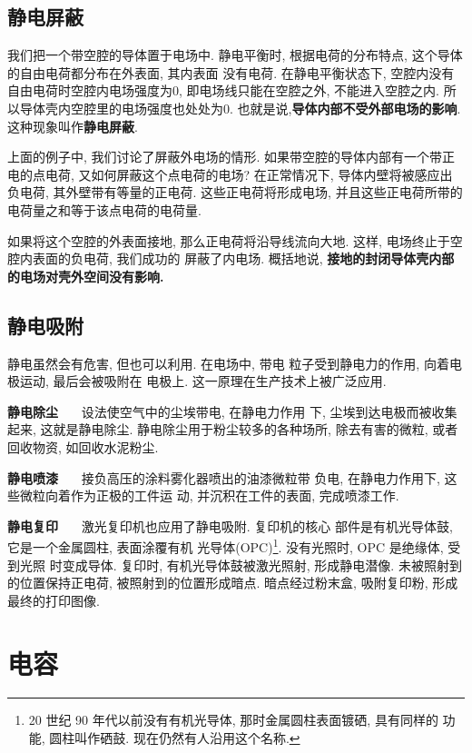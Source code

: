 \documentclass[11pt,a4paper]{ctexbook}
\newcommand{\bre}{\ \ \ }
\begin{document}
\subsection{静电屏蔽}

我们把一个带空腔的导体置于电场中. 静电平衡时, 根据电荷的分布特点, 这个导体的自由电荷都分布在外表面, 其内表面
没有电荷. 在静电平衡状态下, 空腔内没有自由电荷时空腔内电场强度为0, 即电场线只能在空腔之外, 不能进入空腔之内.
所以导体壳内空腔里的电场强度也处处为0. 也就是说,\textbf{导体内部不受外部电场的影响}.
这种现象叫作\textbf{静电屏蔽}.

上面的例子中, 我们讨论了屏蔽外电场的情形. 如果带空腔的导体内部有一个带正电的点电荷, 又如何屏蔽这个点电荷的电场?
在正常情况下, 导体内壁将被感应出负电荷, 其外壁带有等量的正电荷. 这些正电荷将形成电场, 并且这些正电荷所带的
电荷量之和等于该点电荷的电荷量.

如果将这个空腔的外表面接地, 那么正电荷将沿导线流向大地. 这样, 电场终止于空腔内表面的负电荷, 我们成功的
屏蔽了内电场. 概括地说, \textbf{接地的封闭导体壳内部的电场对壳外空间没有影响.}

\subsection{静电吸附}

静电虽然会有危害, 但也可以利用. 在电场中, 带电
粒子受到静电力的作用, 向着电极运动, 最后会被吸附在
电极上. 这一原理在生产技术上被广泛应用.

\textbf{静电除尘} \bre 设法使空气中的尘埃带电, 在静电力作用
下, 尘埃到达电极而被收集起来, 这就是静电除尘.
静电除尘用于粉尘较多的各种场所,
除去有害的微粒, 或者回收物资, 如回收水泥粉尘.

\textbf{静电喷漆} \bre 接负高压的涂料雾化器喷出的油漆微粒带
负电, 在静电力作用下, 这些微粒向着作为正极的工件运
动, 并沉积在工件的表面, 完成喷漆工作.

\textbf{静电复印} \bre 激光复印机也应用了静电吸附. 复印机的核心
部件是有机光导体鼓, 它是一个金属圆柱, 表面涂覆有机
光导体(OPC)\footnote{20 世纪 90 年代以前没有有机光导体, 那时金属圆柱表面镀硒, 具有同样的
功能, 圆柱叫作硒鼓. 现在仍然有人沿用这个名称.}. 没有光照时, OPC 是绝缘体, 受到光照
时变成导体. 复印时, 有机光导体鼓被激光照射, 形成静电潜像.
未被照射到的位置保持正电荷, 被照射到的位置形成暗点.
暗点经过粉末盒, 吸附复印粉, 形成最终的打印图像.

\section{电容}
\end{document}
